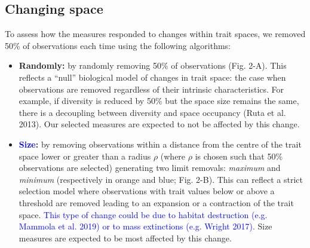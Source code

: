 \documentclass[]{article}
\begin{document}
\subsection{Changing space}\label{changing-spaces}

To assess how the measures responded to changes within trait spaces, we
removed 50\% of observations each time using the following algorithms:

\begin{itemize}
\item
  \textbf{Randomly:} by randomly removing 50\% of observations (Fig.
  2-A). This reflects a ``null'' biological model of changes in trait
  space: the case when observations are removed regardless of their
  intrinsic characteristics. For example, if diversity is reduced by
  50\% but the space size remains the same, there is a decoupling
  between diversity and space occupancy (Ruta et al. 2013). Our selected
  measures are expected to not be affected by this change.
\item
  \textbf{\textcolor{blue}{Size}:} by removing
  observations within a distance from the centre of the trait space
  lower or greater than a radius \(\rho\) (where \(\rho\) is chosen such
  that 50\% observations are selected) generating two limit removals:
  \emph{maximum} and \emph{minimum} (respectively in orange and blue;
  Fig. 2-B). This can reflect a strict selection model where
  observations with trait values below or above a threshold are removed
  leading to an expansion or a contraction of the trait space.
  \textcolor{blue}{This type of change could be due to
  habitat destruction (e.g. Mammola et al. 2019) or to mass extinctions
  (e.g. Wright 2017).} Size measures are expected to be most affected
  by this change.
\end{itemize}
\end{document}
